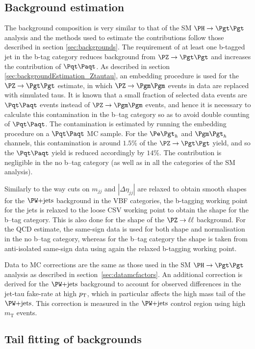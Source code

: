 \subsection{Background estimation}
\label{sec:mssmBackgrounds}
The background composition is very similar to that of the \ac{SM} $\HToTauTau$
analysis and the methods used to estimate the contributions follow those
described in section \ref{sec:backgrounds}. The requirement of at least one
b-tagged jet in the b-tag category reduces background from $\ZToTauTau$
and increases the contribution of $\ttbar$. As described in section
\ref{sec:backgroundEstimation_Ztautau}, an embedding procedure is used for the
$\ZToTauTau$ estimate, in which $\PZ\to\Pgm\Pgm$ events in data are replaced
with simulated taus. It is known that a small fraction of selected data events
are $\ttbar$ events instead of $\PZ\to\Pgm\Pgm$ events, and hence it is
necessary to calculate this contamination in the b--tag category so as to avoid
double counting of $\ttbar$. The contamination is estimated by running the
embedding procedure on a $\ttbar$ \ac{MC} sample. For the $\etau$ and $\mutau$ channels, this
contamination is around $1.5\%$ of the $\ZToTauTau$ yield, and so the $\ttbar$ yield is reduced
accordingly by $14\%$. The contribution is negligible in the no b--tag category (as well
as in all the categories of the \ac{SM} analysis). 

Similarly to the way cuts on $m_{jj}$ and $|\Delta\eta_{jj}|$ are relaxed to
obtain smooth shapes for the $\WJets$ background in the VBF categories, the
b-tagging working point for the jets is relaxed to the loose \ac{CSV} working point to
obtain the shape for the b--tag category. This is also done for the shape of
the $\PZ\to\ell\ell$ background. For the QCD estimate, the same-sign data is used for
both shape and normalisation in the no b--tag category, whereas for the b--tag
category the shape is taken from anti-isolated same-sign data using again the relaxed
b-tagging working point.

Data to \ac{MC} corrections are the same as those used in the \ac{SM}
$\HToTauTau$ analysis as described in section~\ref{sec:datamcfactors}. An
additional correction is derived for the $\WJets$ background to account for
observed differences in the jet-tau fake-rate at high $p_{\mathrm{T}}$, which in particular
affects the high mass tail of the $\WJets$. This correction is measured in the
$\WJets$ control region using high $m_{\mathrm{T}}$ events. 

\subsection{Tail fitting of backgrounds}
\label{sec:tailfitting}

